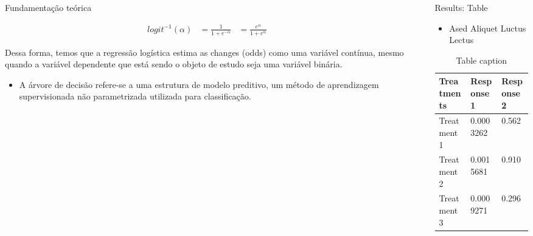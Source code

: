 \documentclass[final,hyperref={pdfpagelabels=false}]{beamer}
\begin{document}
\begin{frame}[t]
\begin{columns}[t]
\begin{column}{.465\textwidth}
\begin{block}{Fundamenta\c c\~ao te\'orica}
\begin{itemize}
\begin{itemize}
\begin{equation}
  \label{eq:t}
  \begin{aligned}
    logit^{-1}(\alpha) &= \frac{1}{1+e^{-\alpha}} &= \frac{e^{\alpha}}{1+e^{\alpha}}
  \end{aligned}
\end{equation}

Dessa forma, temos que a regressão logística estima as changes (odds) como uma variável contínua, mesmo quando a variável dependente que está sendo o objeto de estudo seja uma variável binária. 

\end{itemize}

\begin{itemize}
\item A árvore de decisão refere-se a uma estrutura de modelo preditivo, um método de aprendizagem supervisionada não parametrizada utilizada para classificação.

\end{itemize}

\end{itemize}

\end{block}


\end{column} %

\begin{column}{.03\textwidth}\end{column} %
 
\begin{column}{.465\textwidth} %


\begin{block}{Results: Table}

\begin{itemize}
\item Ased Aliquet Luctus Lectus
\end{itemize}

\begin{table}
\begin{tabular}{l l l}
\toprule
\textbf{Treatments} & \textbf{Response 1} & \textbf{Response 2}\\
\midrule
Treatment 1 & 0.0003262 & 0.562 \\
Treatment 2 & 0.0015681 & 0.910 \\
Treatment 3 & 0.0009271 & 0.296 \\
\bottomrule
\end{tabular}
\caption{Table caption}
\end{table}


\end{block}
\end{column}
\end{columns}
\end{frame}
\end{document}
